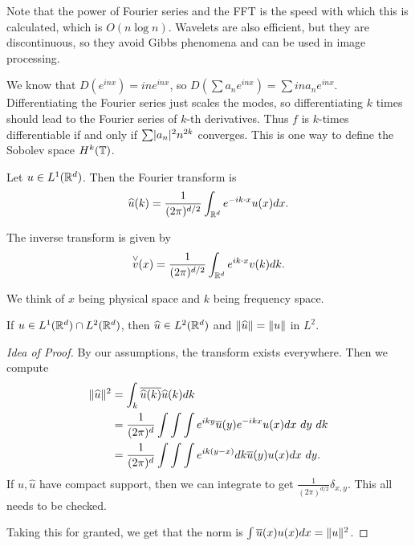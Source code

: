 \documentclass[10pt, twoside]{article}
\begin{document}
    Note that the power of Fourier series and the FFT is the speed with which this is calculated, which is $O(n \log n)$. Wavelets are also efficient, but they are discontinuous, so they avoid Gibbs phenomena and can be used in image processing.

    We know that $D(e^{inx}) = ine^{inx}$, so $D(\sum a_n e^{inx}) = \sum ina_n e^{inx}$. Differentiating the Fourier series just scales the modes, so differentiating $k$ times should lead to the Fourier series of $k$-th derivatives. Thus $f$ is $k$-times differentiable if and only if $\sum \lvert a_n\rvert^2 n^{2k}$ converges. This is one way to define the Sobolev space $H^k(\mathbb{T})$.

    \begin{defn}
        Let $u \in L^1(\mathbb{R}^d)$. Then the Fourier transform is \[\widehat{u}(k) = \frac{1}{(2\pi)^{d/2}} \int_{\mathbb{R}^d} e^{-ik\cdot x} u(x) dx.\]

        The inverse transform is given by \[ \overset{\vee}{v}(x) = \frac{1}{(2\pi)^{d/2}} \int_{\mathbb{R}^d} e^{ik\cdot x} v(k) dk. \]
    \end{defn}

    We think of $x$ being physical space and $k$ being frequency space.

    \begin{thm}[Plancharel]
        If $u \in L^1(\mathbb{R}^d) \cap L^2(\mathbb{R}^d)$, then $\widehat{u} \in L^2(\mathbb{R}^d)$ and $\lVert\widehat{u}\rVert = \lVert u\rVert$ in $L^2$.

        \begin{proof}[Idea of Proof]
            By our assumptions, the transform exists everywhere. Then we compute
            \begin{align*}
                \lVert\widehat{u}\rVert^2 &= \int_k \overline{\widehat{u}(k)} \widehat{u}(k) dk \\
                                     &= \frac{1}{(2\pi)^d} \int \int \int e^{iky} \overline{u}(y) e^{-ikx} u(x) dx \ dy\ dk \\
                                     &= \frac{1}{(2\pi)^d} \int \int \int e^{ik(y-x)} dk \overline{u}(y)u(x) dx \ dy.
            \end{align*}
            If $u, \widehat{u}$ have compact support, then we can integrate to get $\frac{1}{(2\pi)^{d/2}} \delta_{x,y}$. This all needs to be checked.

            Taking this for granted, we get that the norm is $\int \overline{u}(x) u(x) dx = \lVert u\rVert^2$.
        \end{proof}
    \end{thm}
\end{document}
